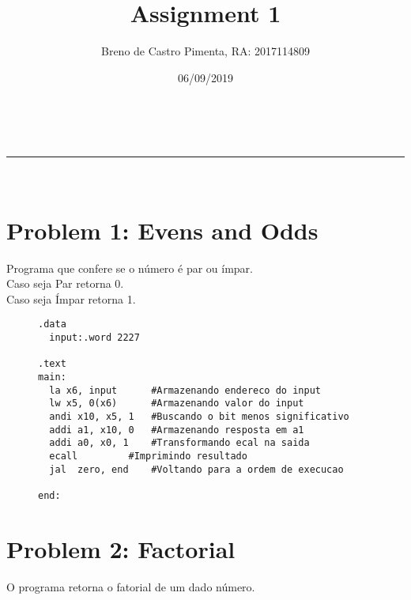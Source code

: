 \documentclass[a4paper,11pt]{article}
\makeatletter
\newcommand{\linia}{\rule{\linewidth}{0.5pt}}
\theoremstyle{mytheor}
\renewcommand{\maketitle}{
\begin{center}
\vspace{2ex}
{\huge \textsc{\@title}}
\vspace{1ex}
\\
\linia\\
\@author \hfill \@date
\vspace{4ex}
\end{center}
}
\makeatother
\begin{document}
\title{Assignment \textnumero{} 1}

\author{Breno de Castro Pimenta, RA: 2017114809}

\date{06/09/2019}

\maketitle

\section*{Problem 1: Evens and Odds}

Programa que confere se o número é par ou ímpar.\\
Caso seja Par retorna 0.\\
Caso seja Ímpar retorna 1.\\

\begin{figure}[htb]
\begin{small}
\begin{lstlisting}[language=riskV]
.data
  input:.word 2227
 
.text
main:
  la x6, input		#Armazenando endereco do input
  lw x5, 0(x6)		#Armazenando valor do input
  andi x10, x5, 1	#Buscando o bit menos significativo
  addi a1, x10, 0	#Armazenando resposta em a1
  addi a0, x0, 1 	#Transformando ecal na saida
  ecall			#Imprimindo resultado
  jal  zero, end	#Voltando para a ordem de execucao

end:
\end{lstlisting}
\end{small}
\end{figure} 

\pagebreak
\section*{Problem 2: Factorial}

O programa retorna o fatorial de um dado número.
\end{document}
